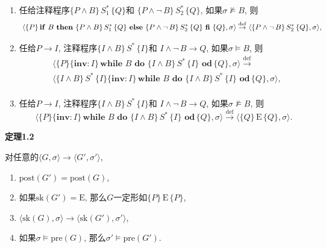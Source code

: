 \documentclass[UTF8]{ctexart}
\begin{document}
\begin{enumerate}
\[        \langle\{P\land B\}\,S_1^*\,\{Q\},\sigma\rangle,\\[1pt]
    \]
    \item 任给注释程序$\{P\land B\}\,S_1^*\,\{Q\}$和
    $\{P\land\neg\,B\}\,S_2^*\,\{Q\}$, 如果$\sigma\not\models B$, 则
    \vspace{1pt}
    \[
        \,\,\langle\{P\}\,\mathbf{if}\,\,B\,\,\mathbf{then}\,\,
        \{P\land B\}\,S_1^*\,\{Q\}\,\,\mathbf{else}\,\,\{P\land\neg\,B\}\,S_2^*
        \,\{Q\}\,\,\mathbf{fi}\,\,\{Q\},\sigma\rangle\overset{\mathrm{def}}{\to}
        \langle\{P\land\neg\,B\}\,S_2^*\,\{Q\},\sigma\rangle,\\[1pt]
    \]
    \item 任给$P\to I$, 注释程序$\{I\land B\}\,S^*\,\{I\}$和
    $I\land\neg\,B\to Q$, 如果$\sigma\models B$, 则
    \vspace{1pt}
    \[\begin{aligned}
        &\langle\{P\}\{\mathbf{inv}:I\}\,\mathbf{while}\,\,B\,\,\mathbf{do}\,\,
        \{I\land B\}\,S^*\,\{I\}\,\,\mathbf{od}\,\{Q\},
        \sigma\rangle\overset{\mathrm{def}}{\to}\\[-3pt]
        &\langle\{I\land B\}\,S^*\,\{I\}\{\mathbf{inv}:I\}\,
        \mathbf{while}\,\,B\,\,\mathbf{do}\,\,
        \{I\land B\}\,S^*\,\{I\}\,\,\mathbf{od}\,\{Q\},
        \sigma\rangle,\\[1pt]
    \end{aligned}\]
    \item 任给$P\to I$, 注释程序$\{I\land B\}\,S^*\,\{I\}$和
    $I\land\neg\,B\to Q$, 如果$\sigma\not\models B$, 则
    \vspace{1pt}
    \[
        \langle\{P\}\{\mathbf{inv}:I\}\,\mathbf{while}\,\,B\,\,\mathbf{do}\,\,
        \{I\land B\}\,S^*\,\{I\}\,\,\mathbf{od}\,\{Q\},
        \sigma\rangle\overset{\mathrm{def}}{\to}
        \langle\{Q\}\,\mathrm{E}\,\{Q\},\sigma\rangle.
    \]
\end{enumerate}





\newpage

\hypertarget{sec:定理1.2}{}
\noindent\textbf{定理1.2}

对任意的$\langle G,\sigma\rangle\to\langle G',\sigma'\rangle$,

\begin{enumerate}
    \item $\mathrm{post}(G')=\mathrm{post}(G)$,
    \item 如果$\mathrm{sk}(G')=\mathrm{E}$,
    那么$G$一定形如$\{P\}\,\mathrm{E}\,\{P\}$,
    \item $\langle\mathrm{sk}(G),\sigma\rangle\to
    \langle\mathrm{sk}(G'),\sigma'\rangle$,
    \item 如果$\sigma\models\mathrm{pre}(G)$,
    那么$\sigma'\models\mathrm{pre}(G')$.
\end{enumerate}
\end{document}
